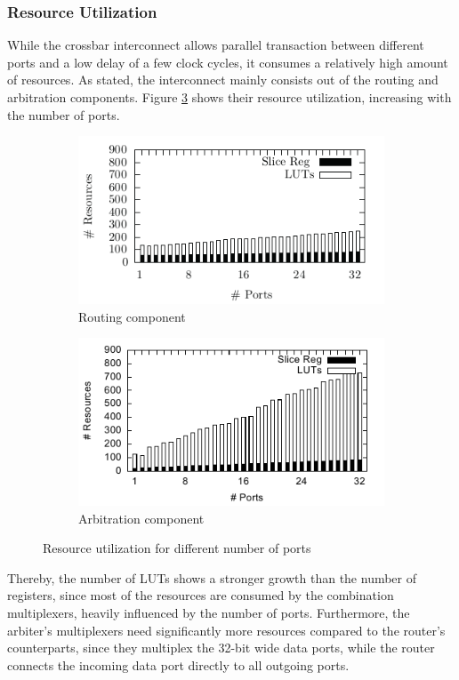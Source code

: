 \subsubsection{Resource Utilization}
While the crossbar interconnect allows parallel transaction between different
ports and a low delay of a few clock cycles, it consumes a relatively high
amount of resources. As stated, the interconnect mainly consists out of the
routing and arbitration components. Figure \ref{fig:crossbar_util} shows their
resource utilization, increasing with the number of ports.
\begin{figure}
	\centering
	\begin{subfigure}{0.49\textwidth}
		\centering
		\includegraphics[width=\textwidth]{../figures/eval_router}
		\caption{Routing component}
		\label{fig:crossbar_util_router}
	\end{subfigure}
	\begin{subfigure}{0.49\textwidth}
		\centering
		\includegraphics[width=\textwidth]{../figures/eval_arbiter}
		\caption{Arbitration component}
		\label{fig:crossbar_util_arbiter}
	\end{subfigure}
	\caption{Resource utilization for different number of ports}
	\label{fig:crossbar_util}
\end{figure}
Thereby, the number of \acp{LUT} shows a stronger growth than the number of
registers, since most of the resources are consumed by the combination
multiplexers, heavily influenced by the number of ports. Furthermore, the
arbiter's multiplexers need significantly more resources compared to the
router's counterparts, since they multiplex the 32-bit wide data ports, while
the router connects the incoming data port directly to all outgoing ports.


